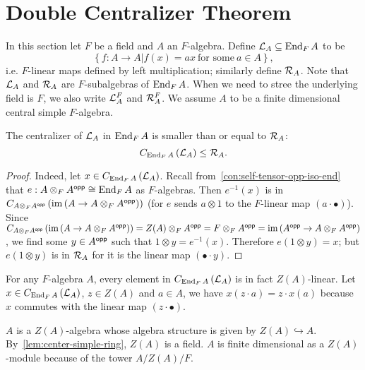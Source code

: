 \section{Double Centralizer Theorem}\label{sec:double-centralizer}

In this section let $F$ be a field and $A$ an $F$-algebra. Define
$\mathcal{L}_{A} \subseteq \operatorname{End}_{F}A$ to be
\[\left\{f : A \to A|f(x)=ax~\text{for some}~a\in A\right\},\]
i.e. $F$-linear maps defined by left multiplication; similarly define
$\mathcal{R}_{A}$. Note that $\mathcal{L}_{A}$ and $\mathcal{R}_A$ are $F$-subalgebras of
$\operatorname{End}_{F}A$. When we need to stree the underlying field is $F$, we also write
$\mathcal{L}_{A}^{F}$ and $\mathcal{R}_{A}^{F}$. We assume $A$ to be a finite dimensional
central simple $F$-algebra.
\begin{lemma}
  \label{lem:centralizer-mul-left-le}
  The centralizer of $\mathcal{L}_{A}$ in $\operatorname{End}_{F}A$ is smaller than or equal to
  $\mathcal{R}_{A}$:
  \[
    C_{\operatorname{End}_{F}A}\left(\mathcal{L}_{A}\right) \le \mathcal{R}_{A}.
  \]
  \leanok {}
\end{lemma}

\begin{proof}
  Indeed, let $x \in C_{\operatorname{End}_{F}A}\left(\mathcal{L}_{A}\right)$. Recall
  from~\cref{con:self-tensor-opp-iso-end} that
  $e : A\otimes_{F}A^{\mathsf{opp}}\cong \operatorname{End}_{F}A$ as $F$-algebras. Then $e^{-1}(x)$ is
  in
  $C_{A\otimes_{F}A^{\mathsf{opp}}}\left(\operatorname{im}\left(A\to A\otimes_{F}A^{\mathsf{opp}}\right)\right)$
  (for $e$ sends $a\otimes 1$ to the $F$-linear map $(a\cdot\bullet)$). Since
  $C_{A\otimes_{F}A^{\mathsf{opp}}}\left(\operatorname{im}\left(A\to A\otimes_{F}A^{\mathsf{opp}}\right)\right) = Z(A)\otimes_{F}A^{\mathsf{opp}}=F\otimes_{F}A^{\mathsf{opp}}=\operatorname{im}\left(A^{\mathsf{opp}}\to A\otimes_{F}A^{\mathsf{opp}}\right)$,
  we find some $y\in A^{\mathsf{opp}}$ such that $1 \otimes y = e^{-1}(x)$. Therefore
  $e\left(1\otimes y\right) = x$; but $e\left(1\otimes y\right)$ is in
  $\mathcal{R}_{A}$ for it is the linear map $(\bullet\cdot y)$.
\end{proof}

\begin{remark}\label{rem:mul-left-center-linear}
  For any $F$-algebra $A$, every element in $C_{\operatorname{End}_{F}A}\left(\mathcal{L}_{A}\right)$
  is in fact $Z(A)$-linear. Let $x\in C_{\operatorname{End}_{F}A}\left(\mathcal{L}_{A}\right)$,
  $z\in Z(A)$ and $a \in A$, we have $x(z\cdot a) = z\cdot x(a)$ because $x$
  commutes with the linear map $\left(z\cdot\bullet\right)$.
\end{remark}

\begin{remark}
  $A$ is a $Z(A)$-algebra whose algebra structure is given by
  $Z(A)\hookrightarrow A$. By~\cref{lem:center-simple-ring}, $Z(A)$ is a field.
  $A$ is finite dimensional as a $Z(A)$-module because of the tower $A/Z(A)/F$.
\end{remark}

